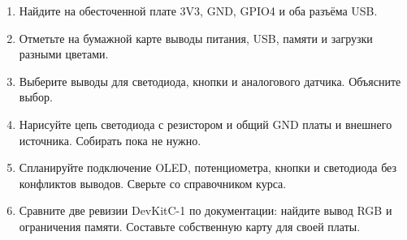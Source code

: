 \endgroup
\begin{tasks}
\begin{enumerate}
\item {} Найдите на обесточенной плате 3V3, GND, GPIO4 и оба разъёма USB.
\item {} Отметьте на бумажной карте выводы питания, USB, памяти и загрузки разными цветами.
\item {} Выберите выводы для светодиода, кнопки и аналогового датчика. Объясните выбор.
\item {} Нарисуйте цепь светодиода с резистором и общий GND платы и внешнего источника. Собирать пока не нужно.
\item {} Спланируйте подключение OLED, потенциометра, кнопки и светодиода без конфликтов выводов. Сверьте со справочником курса.
\item {} Сравните две ревизии DevKitC-1 по документации: найдите вывод RGB и ограничения памяти. Составьте собственную карту для своей платы.
\end{enumerate}
\end{tasks}
